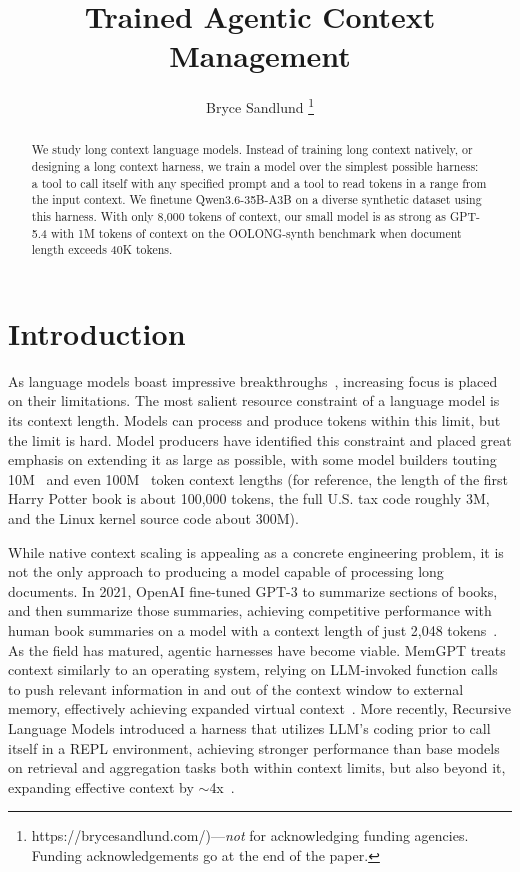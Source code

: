 \documentclass{article} %
\title{Trained Agentic Context Management}
\author{Bryce Sandlund \thanks{https://brycesandlund.com/)---\emph{not} for acknowledging
funding agencies.  Funding acknowledgements go at the end of the paper.} \\
}
\begin{document}
\maketitle

\begin{abstract}
We study long context language models. Instead of training long context natively, or designing a long context harness, we train a model over the simplest possible harness: a tool to call itself with any specified prompt and a tool to read tokens in a range from the input context. We finetune Qwen3.6-35B-A3B on a diverse synthetic dataset using this harness. With only 8,000 tokens of context, our small model is as strong as GPT-5.4 with 1M tokens of context on the OOLONG-synth benchmark when document length exceeds 40K tokens.
\end{abstract}

\section{Introduction}

As language models boast impressive breakthroughs~\citep{luong2025imogold,wei2025imogold,openai2025icpc,lin2025icpcgold,openai2026unitdistance,openai2026tenadvances,openai2026navierstokes}, increasing focus is placed on their limitations. The most salient resource constraint of a language model is its context length. Models can process and produce tokens within this limit, but the limit is hard. Model producers have identified this constraint and placed great emphasis on extending it as large as possible, with some model builders touting 10M~\citep{dangel2026subq,meta2025llama4,zhu2026pokeeisaac} and even 100M~\citep{magic2024ltm2mini} token context lengths (for reference, the length of the first Harry Potter book is about 100,000 tokens, the full U.S. tax code roughly 3M, and the Linux kernel source code about 300M).

While native context scaling is appealing as a concrete engineering problem, it is not the only approach to producing a model capable of processing long documents. In 2021, OpenAI fine-tuned GPT-3 to summarize sections of books, and then summarize those summaries, achieving competitive performance with human book summaries on a model with a context length of just 2,048 tokens~\citep{wu2021recursive}. As the field has matured, agentic harnesses have become viable. MemGPT treats context similarly to an operating system, relying on LLM-invoked function calls to push relevant information in and out of the context window to external memory, effectively achieving expanded virtual context~\citep{packer2023memgpt}. More recently, Recursive Language Models introduced a harness that utilizes LLM's coding prior to call itself in a REPL environment, achieving stronger performance than base models on retrieval and aggregation tasks both within context limits, but also beyond it, expanding effective context by ${\sim}$4x~\citep{zhang2025rlm}.
\end{document}
